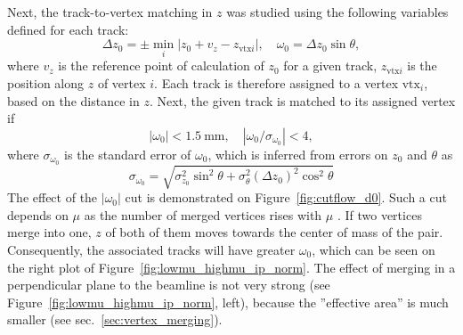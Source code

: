 Next, the track-to-vertex matching in $z$ was studied using the following variables defined for each track:
\begin{equation}
    \Delta z_0 = \pm\min_{i} |z_0 + v_z - z_{\text{vtx}i}|, \quad \omega_0 = \Delta z_0 \sin\theta,
\end{equation}
where $v_z$ is the reference point of calculation of $z_0$ for a given track, $z_{\text{vtx}i}$ is the position along $z$ of vertex $i$.
Each track is therefore assigned to a vertex $\text{vtx}_i$, based on the distance in $z$. Next, the given track is matched to its assigned vertex if 
\begin{equation}
    |\omega_0| < \qty{1.5}{\mm}, \quad |\omega_0/\sigma_{\omega_0}| < 4,
\end{equation}
where $\sigma_{\omega_0}$ is the standard error of $\omega_0$, which is inferred from errors on $z_0$ and $\theta$ as 
\begin{equation}
    \sigma_{\omega_0} = \sqrt{\sigma^2_{z_0}\sin^2\theta + \sigma^2_{\theta}(\Delta z_0)^2\cos^2\theta}
\end{equation}
The effect of the $|\omega_0|$ cut is demonstrated on Figure~\ref{fig:cutflow_d0}. Such a cut depends on $\mu$ as the number of merged vertices rises with $\mu$ \cite{ATLAS:2016nnj}. If two vertices merge into one, $z$ of both of them moves towards the center of mass of the pair. Consequently, the associated tracks will have greater $\omega_0$, which can be seen on the right plot of Figure~\ref{fig:lowmu_highmu_ip_norm}. The effect of merging in a perpendicular plane to the beamline is not very strong (see Figure~\ref{fig:lowmu_highmu_ip_norm}, left), because the ''effective area'' is much smaller (see sec.~\ref{sec:vertex_merging}). 
